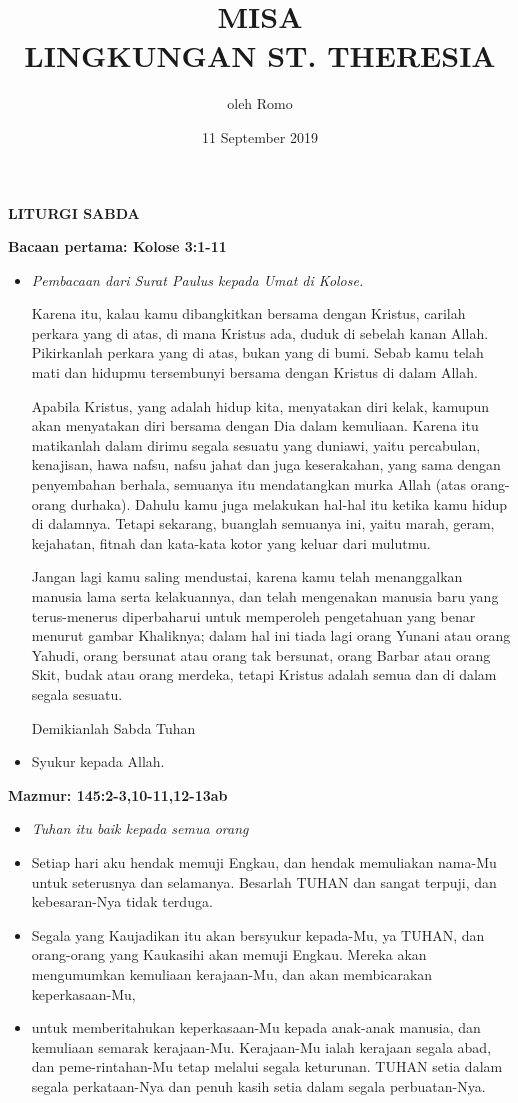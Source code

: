 \documentclass[12pt]{scrartcl}
\title{MISA \\LINGKUNGAN ST. THERESIA}
\author{oleh Romo \romo}
\date{11 September 2019}
\makeatletter
\newcommand{\judul}[1]{%
  {\parindent \z@ \centering \normalfont
    \interlinepenalty\@M \Large \bfseries #1\par\nobreak \vskip 20\p@ }}
\newcommand{\subjudul}[1]{%
  {\parindent \z@ \normalfont
    \interlinepenalty\@M \bfseries #1\par\nobreak \vskip 20\p@ }}
\newcommand{\BU}[1]{\begin{itemize} \item[U:] #1 \end{itemize}}
\newcommand{\BP}[1]{\begin{itemize} \item[P:] #1 \end{itemize}}
\makeatother
\begin{document}
\maketitle
\Large
\thispagestyle{empty}

\judul{LITURGI SABDA}

\subjudul{Bacaan pertama: Kolose 3:1-11}

\BP{\emph{Pembacaan dari Surat Paulus kepada Umat di Kolose.}

Karena itu, kalau kamu dibangkitkan bersama dengan Kristus, carilah perkara yang di atas, di mana Kristus ada, duduk di sebelah kanan Allah.
Pikirkanlah perkara yang di atas, bukan yang di bumi.
Sebab kamu telah mati dan hidupmu tersembunyi bersama dengan Kristus di dalam Allah.

Apabila Kristus, yang adalah hidup kita, menyatakan diri kelak, kamupun akan menyatakan diri bersama dengan Dia dalam kemuliaan.
Karena itu matikanlah dalam dirimu segala sesuatu yang duniawi, yaitu percabulan, kenajisan, hawa nafsu, nafsu jahat dan juga keserakahan, yang sama dengan penyembahan berhala,
semuanya itu mendatangkan murka Allah (atas orang-orang durhaka).
Dahulu kamu juga melakukan hal-hal itu ketika kamu hidup di dalamnya.
Tetapi sekarang, buanglah semuanya ini, yaitu marah, geram, kejahatan, fitnah dan kata-kata kotor yang keluar dari mulutmu.

Jangan lagi kamu saling mendustai, karena kamu telah menanggalkan manusia lama serta kelakuannya,
dan telah mengenakan manusia baru yang terus-menerus diperbaharui untuk memperoleh pengetahuan yang benar menurut gambar Khaliknya;
dalam hal ini tiada lagi orang Yunani atau orang Yahudi, orang bersunat atau orang tak bersunat, orang Barbar atau orang Skit, budak atau orang merdeka, tetapi Kristus adalah semua dan di dalam segala sesuatu.

Demikianlah Sabda Tuhan}
\BU{Syukur kepada Allah.}

\subjudul{Mazmur:  145:2-3,10-11,12-13ab}

\BP{\emph{Tuhan itu baik kepada semua orang}}

\begin{itemize}
	\item 
Setiap hari aku hendak memuji Engkau, dan hendak memuliakan nama-Mu untuk seterusnya dan selamanya.
Besarlah TUHAN dan sangat terpuji, dan kebesaran-Nya tidak terduga.

\item
Segala yang Kaujadikan itu akan bersyukur kepada-Mu, ya TUHAN, dan orang-orang yang Kaukasihi akan memuji Engkau.
Mereka akan mengumumkan kemuliaan kerajaan-Mu, dan akan membicarakan keperkasaan-Mu,

\item 
untuk memberitahukan keperkasaan-Mu kepada anak-anak manusia, dan kemuliaan semarak kerajaan-Mu.
Kerajaan-Mu ialah kerajaan segala abad, dan peme-rintahan-Mu tetap melalui segala keturunan. TUHAN setia dalam segala perkataan-Nya dan penuh kasih setia dalam segala perbuatan-Nya.
\end{itemize}	
\end{document}
